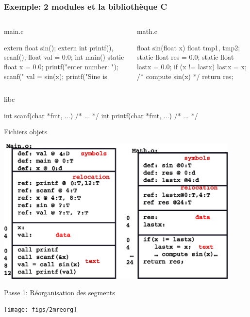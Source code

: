 \documentclass[11pt]{beamer}
\begin{document}
\begin{frame}[fragile]
\frametitle{Exemple: 2 modules et la bibliothèque C}
\vspace*{-3mm}
\begin{columns}[T]
\begin{block}{main.c}%
\begin{ccode}
extern float sin();
extern int printf(), scanf();
float val = 0.0;
int main() {
  static float x = 0.0;
  printf("enter number: ");
  scanf("%
  val = sin(x);
  printf("Sine is %
}
\end{ccode}
\end{block}
\begin{block}{math.c}
\begin{ccode}
float sin(float x) {
  float tmp1, tmp2;
  static float res = 0.0;
  static float lastx = 0.0;
  if (x != lastx) {
    lastx = x;
    /* compute sin(x) */
  }
  return res;
}
\end{ccode}
\end{block}
\end{columns}
\begin{block}{libc}
\begin{ccode}
int scanf(char *fmt, ...) { /* ... */ }
int printf(char *fmt, ...) { /* ... */ }
\end{ccode}
\end{block}
\end{frame}

\begin{slide}{Fichiers objets}
\vspace*{-.2in}
\centerline{\includegraphics[width=4.8in]{figs/2mobj}}
\end{slide}

\begin{slide}{Passe 1: Réorganisation des segments}
\vspace*{-.2in}
\centerline{\texttt{[image: figs/2mreorg]}}
\end{slide}
\end{document}
